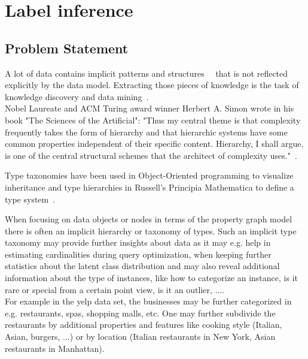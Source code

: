 \chapter{Label inference}
\section{Problem Statement}\label{\positionnumber}
A lot of data contains implicit patterns and structures~\cite{mitchell2006discipline}~\cite{carlsson2009topology} that is not reflected explicitly by the data model. Extracting those pieces of knowledge is the task of knowledge discovery and data mining~\cite{SIGKDD-2019-12-11}. \\

Nobel Laureate and ACM Turing award winner Herbert A. Simon wrote in his book "The Sciences of the Artificial": "Thus my central theme is that complexity frequently takes the form of hierarchy and that hierarchic systems have some common properties independent of their specific content. Hierarchy, I shall argue, is one of the central structural schemes that the architect of complexity uses."~\cite{simon2019sciences}.

Type taxonomies have been used in Object-Oriented programming to visualize inheritance and type hierarchies in Russell's Principia Mathematica to define a type system~\cite{whitehead1912principia, TUPPER2011369}.

When focusing on data objects or nodes in terms of the property graph model there is often an implicit hierarchy or taxonomy of types. Such an implicit type taxonomy may provide further insights about data as it may e.g. help in estimating cardinalities during query optimization, when keeping further statistics about the latent class distribution and may also reveal additional information about the type of instances, like how to categorize an instance, is it rare or special from a certain point view, is it an outlier, $\dots$. \\

For example in the yelp data set, the businesses may be further categorized in e.g. restaurants, spas, shopping malls, etc. One may further subdivide the restaurants by additional properties and features like cooking style (Italian, Asian, burgers, $\dots$) or  by location (Italian restaurants in New York, Asian restaurants in Manhattan).\\

